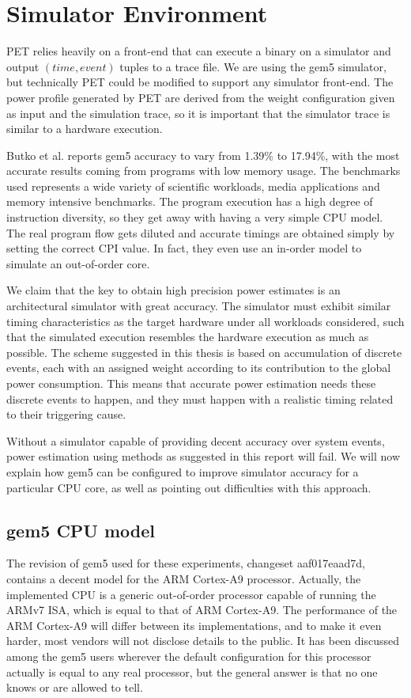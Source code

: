 \section{Simulator Environment}

PET relies heavily on a front-end that can execute a binary on a simulator and
output $(time, event)$ tuples to a trace file. We are using the gem5 simulator,
but technically PET could be modified to support any simulator front-end.
The power profile generated by PET are derived from the weight configuration
given as input and the simulation trace, so it is important that the simulator
trace is similar to a hardware execution.

Butko et al. \cite{butko2012accuracy} reports gem5 accuracy to vary from 1.39\%
to 17.94\%, with the most accurate results coming from programs with low memory
usage. The benchmarks used represents a wide variety of scientific workloads,
media applications and memory intensive benchmarks. The program execution has a
high degree of instruction diversity, so they get away with having a very simple
CPU model. The real program flow gets diluted and accurate timings are obtained
simply by setting the correct CPI value. In fact, they even use an in-order
model to simulate an out-of-order core.

We claim that the key to obtain high precision power estimates is an
architectural simulator with great accuracy. The simulator must exhibit similar
timing characteristics as the target hardware under all workloads considered,
such that the simulated execution resembles the hardware execution as much as
possible. The scheme suggested in this thesis is based on accumulation of
discrete events, each with an assigned weight according to its contribution to
the global power consumption. This means that accurate power estimation needs
these discrete events to happen, and they must happen with a realistic timing
related to their triggering cause.

Without a simulator capable of providing decent accuracy over system events,
power estimation using methods as suggested in this report will fail. We will
now explain how gem5 can be configured to improve simulator accuracy for a
particular CPU core, as well as pointing out difficulties with this approach.


\subsection{gem5 CPU model}
The revision of gem5 used for these experiments, changeset aaf017eaad7d,
contains a decent model for the ARM Cortex-A9 processor. Actually, the
implemented CPU is a generic out-of-order processor capable of running the ARMv7
ISA, which is equal to that of ARM Cortex-A9\cite{armtech}. The performance of
the ARM Cortex-A9 will differ between its implementations, and to make it even
harder, most vendors will not disclose details to the public. It has been
discussed among the gem5 users wherever the default configuration for this
processor actually is equal to any real processor\cite{a15maillist}, but the
general answer is that no one knows or are allowed to tell.

